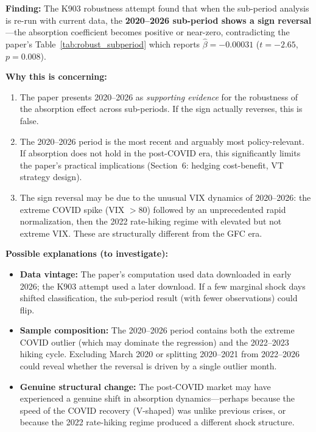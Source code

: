 \documentclass[12pt,a4paper]{article}
\begin{document}
\textbf{Finding:} The K903 robustness attempt found that when the sub-period analysis is re-run with current data, the \textbf{2020--2026 sub-period shows a sign reversal}---the absorption coefficient becomes positive or near-zero, contradicting the paper's Table~\ref{tab:robust_subperiod} which reports $\hat{\beta} = -0.00031$ ($t = -2.65$, $p = 0.008$).

\textbf{Why this is concerning:}
\begin{enumerate}[nosep]
\item The paper presents 2020--2026 as \textit{supporting evidence} for the robustness of the absorption effect across sub-periods. If the sign actually reverses, this is false.
\item The 2020--2026 period is the most recent and arguably most policy-relevant. If absorption does not hold in the post-COVID era, this significantly limits the paper's practical implications (Section~6: hedging cost-benefit, VT strategy design).
\item The sign reversal may be due to the unusual VIX dynamics of 2020--2026: the extreme COVID spike (VIX $> 80$) followed by an unprecedented rapid normalization, then the 2022 rate-hiking regime with elevated but not extreme VIX. These are structurally different from the GFC era.
\end{enumerate}

\textbf{Possible explanations (to investigate):}
\begin{itemize}[nosep]
\item \textbf{Data vintage:} The paper's computation used data downloaded in early 2026; the K903 attempt used a later download. If a few marginal shock days shifted classification, the sub-period result (with fewer observations) could flip.
\item \textbf{Sample composition:} The 2020--2026 period contains both the extreme COVID outlier (which may dominate the regression) and the 2022--2023 hiking cycle. Excluding March 2020 or splitting 2020--2021 from 2022--2026 could reveal whether the reversal is driven by a single outlier month.
\item \textbf{Genuine structural change:} The post-COVID market may have experienced a genuine shift in absorption dynamics---perhaps because the speed of the COVID recovery (V-shaped) was unlike previous crises, or because the 2022 rate-hiking regime produced a different shock structure.
\end{itemize}
\end{document}
